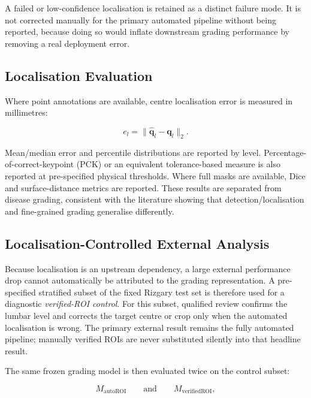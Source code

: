 A failed or low-confidence localisation is retained as a distinct failure mode.
It is not corrected manually for the primary automated pipeline without being
reported, because doing so would inflate downstream grading performance by
removing a real deployment error.

\subsection{Localisation Evaluation}
\label{sec:method-localisation-eval}

Where point annotations are available, centre localisation error is measured in
millimetres:

\begin{equation}
e_l = \|\hat{\mathbf{q}}_l-\mathbf{q}_l\|_2.
\label{eq:localisation-error}
\end{equation}

Mean/median error and percentile distributions are reported by level.
Percentage-of-correct-keypoint (PCK) or an equivalent tolerance-based measure is
also reported at pre-specified physical thresholds. Where full masks are
available, Dice and surface-distance metrics are reported. These results are
separated from disease grading, consistent with the literature showing that
detection/localisation and fine-grained grading generalise differently.

\subsection{Localisation-Controlled External Analysis}
\label{sec:method-localisation-control}

Because localisation is an upstream dependency, a large external performance
drop cannot automatically be attributed to the grading representation. A
pre-specified stratified subset of the fixed Rizgary test set is therefore used
for a diagnostic \emph{verified-ROI control}. For this subset, qualified review
confirms the lumbar level and corrects the target centre or crop only when the
automated localisation is wrong. The primary external result remains the fully
automated pipeline; manually verified ROIs are never substituted silently into
that headline result.

The same frozen grading model is then evaluated twice on the control subset:

\begin{equation}
M_{\mathrm{autoROI}}
\qquad\text{and}\qquad
M_{\mathrm{verifiedROI}},
\end{equation}

